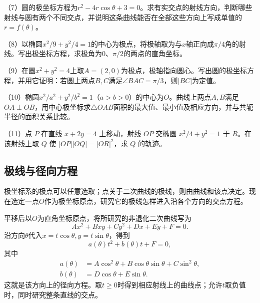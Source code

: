 \begin{exercise}
\begin{samepage}
（7）圆的极坐标方程为\(r^2-4r\cos\theta+3=0\)。求有实交点的射线方向，判断哪些射线与圆有两个不同交点，并说明这条曲线能否在全部这些方向上写成单值的\(r=f(\theta)\)。
\par\end{samepage}
\begin{samepage}
（8）以椭圆\(x^2/9+y^2/4=1\)的中心为极点，将极轴取为与\(x\)轴正向成\(\pi/4\)角的射线。写出极坐标方程，求极角为\(0\)、\(\pi/2\)的两点的直角坐标。
\par\end{samepage}
\begin{samepage}
（9）在圆\(x^2+y^2=4\)上取\(A=(2,0)\)为极点，极轴指向圆心。写出圆的极坐标方程，并用它证明：若圆上两点\(B,C\)满足\(\angle BAC=\pi/3\)，则\(|BC|\)为定值。
\par\end{samepage}

\begin{samepage}
（10）椭圆\(x^2/a^2+y^2/b^2=1\)（\(a>b>0\)）的中心为\(O\)。曲线上两点\(A,B\)满足\(OA\perp OB\)，用中心极坐标求\(\triangle OAB\)面积的最大值、最小值及相应方向，并与共轭半径的面积关系比较。
\par\end{samepage}
\begin{samepage}
（11）点 \(P\) 在直线 \(x+2y=4\) 上移动，射线 \(OP\) 交椭圆 \(x^2/4+y^2=1\) 于 \(R\)。在该射线上取 \(Q\) 使 \(|OP||OQ|=|OR|^2\)，求 \(Q\) 的轨迹。
\par\end{samepage}
\end{exercise}

\newpage
\subsection{极线与径向方程}
\label{subsec:quadratic-polar-line-and-radial-equation}

极坐标系的极点可以任意选取；点关于二次曲线的极线，则由曲线和该点决定。现在选定一点\(O\)作为极坐标原点，研究它的极线怎样进入沿各个方向的交点方程。

平移后以\(O\)为直角坐标原点，将所研究的非退化二次曲线写为
\begin{equation}\label{eq:quadratic-polar-origin-equation}
 Ax^2+Bxy+Cy^2+Dx+Ey+F=0.
\end{equation}
沿方向\(\theta\)代入\(x=t\cos\theta,y=t\sin\theta\)，得到
\begin{equation}\label{eq:quadratic-radial-scalar-equation}
 a(\theta)t^2+b(\theta)t+F=0,
\end{equation}
其中
\begin{equation*}
 \begin{aligned}
 a(\theta)&=A\cos^2\theta+B\cos\theta\sin\theta+C\sin^2\theta,\\
 b(\theta)&=D\cos\theta+E\sin\theta.
 \end{aligned}
\end{equation*}
这就是该方向上的{\heiti{}径向方程}。取\(t\ge0\)时得到相应射线上的曲线点；允许\(t\)取负值时，同时研究整条直线的交点。

